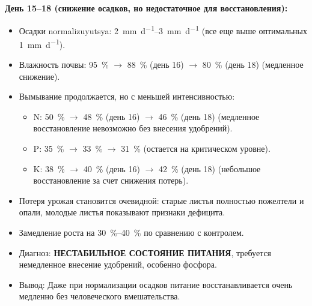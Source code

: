 \textbf{День 15--18 (снижение осадков, но недостаточное для восстановления):}
\begin{itemize}
    \item Осадки normalizuyutsya: \SIrange{2}{3}{\milli\meter\per\day} (все еще выше оптимальных \SI{1}{\milli\meter\per\day}).
    \item Влажность почвы: \SI{95}{\percent} $\to$ \SI{88}{\percent} (день \num{16}) $\to$ \SI{80}{\percent} (день \num{18}) (медленное снижение).
    \item Вымывание продолжается, но с меньшей интенсивностью:
    \begin{itemize}
        \item N: \SI{50}{\percent} $\to$ \SI{48}{\percent} (день \num{16}) $\to$ \SI{46}{\percent} (день \num{18}) (медленное восстановление невозможно без внесения удобрений).
        \item P: \SI{35}{\percent} $\to$ \SI{33}{\percent} $\to$ \SI{31}{\percent} (остается на критическом уровне).
        \item K: \SI{38}{\percent} $\to$ \SI{40}{\percent} (день \num{16}) $\to$ \SI{42}{\percent} (день \num{18}) (небольшое восстановление за счет снижения потерь).
    \end{itemize}
    \item Потеря урожая становится очевидной: старые листья полностью пожелтели и опали, молодые листья показывают признаки дефицита.
    \item Замедление роста на \SIrange{30}{40}{\percent} по сравнению с контролем.
    \item Диагноз: \textbf{НЕСТАБИЛЬНОЕ СОСТОЯНИЕ ПИТАНИЯ}, требуется немедленное внесение удобрений, особенно фосфора.
    \item Вывод: Даже при нормализации осадков питание восстанавливается очень медленно без человеческого вмешательства.
\end{itemize}

